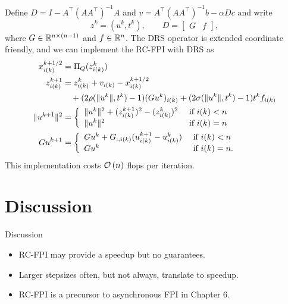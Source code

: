\documentclass[10pt,mathserif]{beamer}
\begin{document}
\begin{frame}
Define $D=I-A^\intercal(AA^\intercal)^{-1}A$ and $v=A^\intercal(AA^\intercal)^{-1}b-\alpha Dc$ %
and write
\[
z^k=(u^k,t^k),
\qquad
D=
\begin{bmatrix}
G&f
\end{bmatrix},
\]
where $G\in \mathbb{R}^{n\times (n-1)}$ and $f\in \mathbb{R}^{n}$.
The DRS operator is extended coordinate friendly, and we can implement the RC-FPI with DRS as
\begin{align*}
    x^{k+1/2}_{i(k)}&=\Pi_{Q}(z^k_{i(k)})\\
    z^{k+1}_{i(k)}
    &=z^k_{i(k)}+v_{i(k)}-x^{k+1/2}_{i(k)}\\
    &\quad +(2\rho(\|u^k\|,t^k)-1)(Gu^k)_{i(k)}+(2\sigma(\|u^k\|,t^k)-1)t^kf_{i(k)}\\
    \|u^{k+1}\|^2&=
\left\{
\begin{array}{ll}
\|u^k\|^2+(z^{k+1}_{i(k)})^2-(z^k_{i(k)})^2&\text{ if }i(k)<n\\
\|u^k\|^2&\text{ if }i(k)=n
\end{array}
\right.\\
Gu^{k+1}&=
\left\{
\begin{array}{ll}
Gu^k+G_{:,i(k)}(u^{k+1}_{i(k)}-u^{k}_{i(k)})&\text{ if }i(k)<n\\
Gu^k&\text{ if }i(k)=n.
\end{array}
\right.
\end{align*}
This implementation costs ${\mathcal{O}\left(n\right)}$ flops per iteration.

\end{frame}

\section{Discussion}

\begin{frame}{Discussion}
\begin{itemize}
    \item RC-FPI may provide a speedup but no guarantees.
    \bigskip\pause
    
    \item Larger stepsizes often, but not always, translate to speedup.
    \bigskip\pause
    
    \item RC-FPI is a precursor to asynchronous FPI in Chapter 6.
\end{itemize}    
\end{frame}
\end{document}

